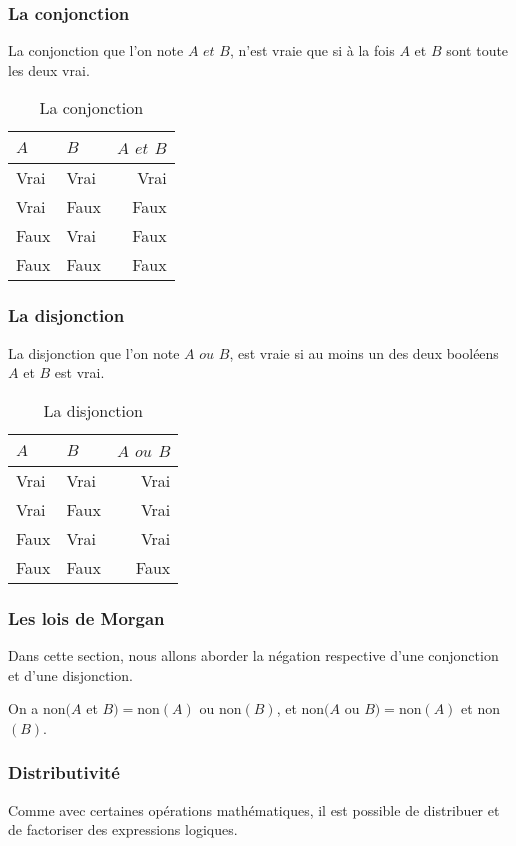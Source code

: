 \subsubsection{La conjonction}
La conjonction que l'on note $A$ $et$ $B$, n'est vraie que si à la fois $A$ et $B$ sont toute les deux vrai.
\begin{table}[h]
\centering
\begin{tabu} spread \linewidth {|l|l|r|}
\hline
$A$ & $B$ & $A$ $et$ $B$ \\ \hline
Vrai & Vrai & Vrai \\ \hline
Vrai & Faux & Faux \\ \hline
Faux & Vrai & Faux \\ \hline
Faux & Faux & Faux \\ \hline
\end{tabu}
\caption{La conjonction}
\end{table}
\subsubsection{La disjonction}
La disjonction que l'on note $A$ $ou$ $B$, est vraie si au moins un des deux booléens $A$ et $B$ est vrai.
\begin{table}[h]
\centering
\begin{tabu} spread \linewidth {|l|l|r|}
\hline
$A$ & $B$ & $A$ $ou$ $B$ \\ \hline
Vrai & Vrai & Vrai \\ \hline
Vrai & Faux & Vrai \\ \hline
Faux & Vrai & Vrai \\ \hline
Faux & Faux & Faux \\ \hline
\end{tabu}
\caption{La disjonction}
\end{table}
\subsubsection{Les lois de Morgan}
Dans cette section, nous allons aborder la négation respective d'une conjonction et d'une disjonction.

On a non$(A$ et $B) = $non$(A)$ ou non$(B)$,
et non$(A$ ou $B) = $non$(A)$ et non$(B)$.

\subsubsection{Distributivité}
Comme avec certaines opérations mathématiques, il est possible de distribuer et de factoriser des expressions logiques.

